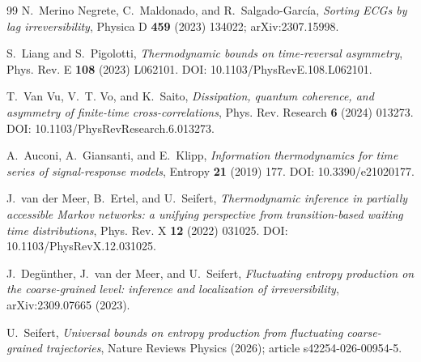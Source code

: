 \documentclass[11pt]{article}
\theoremstyle{definition}
\begin{document}
\begin{thebibliography}{99}
 N.~Merino Negrete, C.~Maldonado, and R.~Salgado-Garc\'ia, \emph{Sorting ECGs by lag irreversibility}, Physica D \textbf{459} (2023) 134022; arXiv:2307.15998.

 S.~Liang and S.~Pigolotti, \emph{Thermodynamic bounds on time-reversal asymmetry}, Phys. Rev. E \textbf{108} (2023) L062101. DOI: 10.1103/PhysRevE.108.L062101.

 T.~Van Vu, V.~T. Vo, and K.~Saito, \emph{Dissipation, quantum coherence, and asymmetry of finite-time cross-correlations}, Phys. Rev. Research \textbf{6} (2024) 013273. DOI: 10.1103/PhysRevResearch.6.013273.

 A.~Auconi, A.~Giansanti, and E.~Klipp, \emph{Information thermodynamics for time series of signal-response models}, Entropy \textbf{21} (2019) 177. DOI: 10.3390/e21020177.

 J.~van der Meer, B.~Ertel, and U.~Seifert, \emph{Thermodynamic inference in partially accessible Markov networks: a unifying perspective from transition-based waiting time distributions}, Phys. Rev. X \textbf{12} (2022) 031025. DOI: 10.1103/PhysRevX.12.031025.

 J.~Deg\"unther, J.~van der Meer, and U.~Seifert, \emph{Fluctuating entropy production on the coarse-grained level: inference and localization of irreversibility}, arXiv:2309.07665 (2023).

 U.~Seifert, \emph{Universal bounds on entropy production from fluctuating coarse-grained trajectories}, Nature Reviews Physics (2026); article s42254-026-00954-5.


\end{thebibliography}
\end{document}
